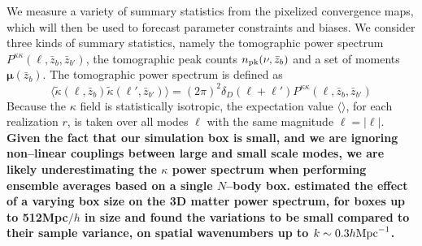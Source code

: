 \documentclass[reprint,aps,prd,superscriptaddress,showkeys,showpacs]{revtex4-1}
\begin{document}
We measure a variety of summary statistics from the pixelized convergence maps, which will then be used to forecast parameter constraints and biases. We consider three kinds of summary statistics, namely the tomographic power spectrum $P^{\kappa\kappa}(\ell,\bar{z}_b,\bar{z}_{b'})$, the tomographic peak counts $n_{\rm pk}(\nu,\bar{z}_b)$ and a set of moments $\pmb{\mu}(\bar{z}_b)$. The tomographic power spectrum is defined as 
\begin{equation}
\langle\tilde{\kappa}(\pmb{\ell},\bar{z}_b)\tilde{\kappa}(\pmb{\ell}',\bar{z}_{b'})\rangle = (2\pi)^2\delta_D(\pmb{\ell}+\pmb{\ell}')P^{\kappa\kappa}(\ell,\bar{z}_b,\bar{z}_{b'})
\end{equation}
%
Because the $\kappa$ field is statistically isotropic, the expectation value $\langle\rangle$, for each realization $r$, is taken over all modes $\pmb{\ell}$ with the same magnitude $\ell=\vert\pmb{\ell}\vert$. {\bf \color{red} Given the fact that our simulation box is small, and we are ignoring non--linear couplings between large and small scale modes, we are likely underestimating the $\kappa$ power spectrum when performing ensemble averages based on a single $N$--body box. \citep{NbodySample} estimated the effect of a varying box size on the 3D matter power spectrum, for boxes up to 512Mpc$/h$ in size and found the variations to be small compared to their sample variance, on spatial wavenumbers up to $k\sim 0.3h{\rm Mpc}^{-1}$. }
\end{document}
